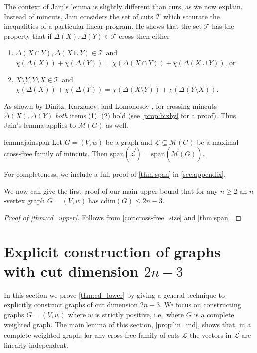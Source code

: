 \documentclass[10pt,a4paper]{article}
\newcommand{\Lcal}{\mathcal{L}}
\newcommand{\M}{\mathcal{M}}
\newcommand{\Tcal}{\mathcal{T}}
\newcommand{\laspan}{\mathrm{span}}
\newcommand{\cd}{\mathrm{cdim}}
\newcommand{\1}{\mathbf{1}}
\theoremstyle{definition}
\begin{document}
The context of Jain's lemma is slightly different than ours, as we now explain.  Instead of mincuts, Jain considers the set of cuts
$\Tcal$ which saturate the inequalities of a particular linear program.  He shows that the set $\Tcal$ has the property that if $\Delta(X),\Delta(Y) \in \Tcal$
cross then either
\begin{enumerate}
\item $\Delta(X \cap Y), \Delta(X \cup Y) \in \Tcal$ and $\chi(\Delta(X)) + \chi(\Delta(Y)) = \chi(\Delta(X \cap Y)) + \chi(\Delta(X \cup Y))$, or
\item $X \setminus Y, Y \setminus X \in \Tcal$ and $\chi(\Delta(X)) + \chi(\Delta(Y)) = \chi(\Delta(X \setminus Y)) + \chi(\Delta(Y \setminus X)).$
\end{enumerate}
As shown by Dinitz, Karzanov, and Lomonosov \cite{DKL76}, for crossing mincuts $\Delta(X),\Delta(Y)$ \emph{both} items (1), (2) hold (see \cref{prop:bixby} for a proof).
Thus Jain's lemma applies to $\M(G)$ as well.
\begin{restatable}{lemma}{jainspan}\label{thm:span}
Let $G = (V,w)$ be a graph and $\Lcal \subseteq \M(G)$ be a maximal cross-free family of mincuts.
Then $\laspan(\vec{\Lcal}) = \laspan(\vec{\M}(G))$.
\end{restatable}
For completeness, we include a full proof of \cref{thm:span} in \cref{sec:appendix}.

We now can give the first proof of our main upper bound that for any $n\ge 2$ an $n$-vertex graph $G=(V,w)$ has $\cd(G) \le 2n-3$.

\begin{proof}[Proof of \cref{thm:cd_upper}]
Follows from \cref{cor:cross-free_size} and \cref{thm:span}.
\end{proof}

%

\section{Explicit construction of graphs with cut dimension $2n-3$}\label{sec:construction}
In this section we prove \cref{thm:cd_lower} by giving a general technique to explicitly construct graphs of cut dimension $2n-3$.  We focus
on constructing graphs $G = (V,w)$ where $w$ is strictly positive, i.e.\ where $G$ is a complete weighted graph.
The main lemma of this section, \cref{prop:lin_ind}, shows that, in a complete weighted graph, for any cross-free family of cuts $\Lcal$
the vectors in $\vec{\Lcal}$ are linearly independent.
\end{document}
